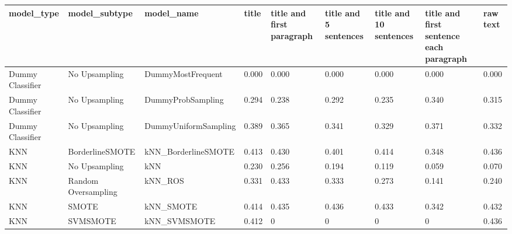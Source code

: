 \begin{tabular}{lllllllll}
\toprule
                  model\_type &       model\_subtype &                                   model\_name & title & title and first paragraph & title and 5 sentences & title and 10 sentences & title and first sentence each paragraph &  raw text \\
\midrule
            Dummy Classifier &       No Upsampling &                            DummyMostFrequent & 0.000 &                     0.000 &                 0.000 &                  0.000 &                                   0.000 &     0.000 \\
            Dummy Classifier &       No Upsampling &                            DummyProbSampling & 0.294 &                     0.238 &                 0.292 &                  0.235 &                                   0.340 &     0.315 \\
            Dummy Classifier &       No Upsampling &                         DummyUniformSampling & 0.389 &                     0.365 &                 0.341 &                  0.329 &                                   0.371 &     0.332 \\
                         KNN &     BorderlineSMOTE &                          kNN\_BorderlineSMOTE & 0.413 &                     0.430 &                 0.401 &                  0.414 &                                   0.348 &     0.436 \\
                         KNN &       No Upsampling &                                          kNN & 0.230 &                     0.256 &                 0.194 &                  0.119 &                                   0.059 &     0.070 \\
                         KNN & Random Oversampling &                                      kNN\_ROS & 0.331 &                     0.433 &                 0.333 &                  0.273 &                                   0.141 &     0.240 \\
                         KNN &               SMOTE &                                    kNN\_SMOTE & 0.414 &                     0.435 &                 0.436 &                  0.433 &                                   0.342 &     0.432 \\
                         KNN &            SVMSMOTE &                                 kNN\_SVMSMOTE & 0.412 &                         0 &                     0 &                      0 &                                       0 &     0.436 \\

\end{tabular}
